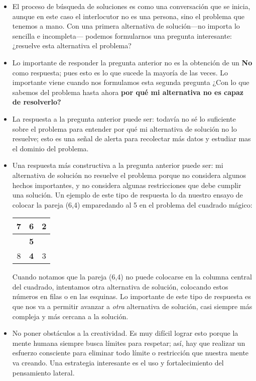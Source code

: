 \begin{itemize}
\item El proceso de búsqueda de soluciones es como una conversación que se inicia,
aunque en este caso el interlocutor no es una persona, sino el problema que tenemos a mano. 
Con una primera alternativa de solución---no importa lo sencilla e incompleta--- podemos 
formularnos una pregunta interesante: ¿resuelve esta alternativa el problema?

\item Lo importante de responder la pregunta anterior no es la obtención de un {\bf No} 
como respuesta; pues esto es lo que sucede la mayoría de las veces. Lo importante
viene cuando nos formulamos esta segunda pregunta ¿Con lo que sabemos del 
problema hasta ahora {\bf por qué mi alternativa no es capaz de resolverlo?} 

\item La respuesta a la pregunta anterior puede ser: todavía no sé lo suficiente 
sobre el problema para entender por qué mi alternativa de solución no lo resuelve;
esto es una señal de alerta para recolectar más datos y estudiar mas el dominio
del problema.

\item Una respuesta más constructiva a la pregunta anterior puede ser: mi alternativa
de solución no resuelve el problema porque no considera algunos hechos importantes,
y no considera algunas restricciones que debe cumplir una solución. Un ejemplo de
este tipo de respuesta lo da nuestro ensayo de colocar la pareja (6,4) emparedando
al 5 en el problema del cuadrado mágico:

\begin{center}
\begin{tabular}{|c|c|c|}
\hline 
 7 & {\bf 6} & 2\tabularnewline
\hline
  & {\bf 5} & \tabularnewline
\hline 
 8 & {\bf 4} & 3 \tabularnewline
\hline
\end{tabular}
\end{center}


Cuando notamos que la pareja (6,4) no puede colocarse en la columna central del 
cuadrado, intentamos otra alternativa de solución, colocando estos
números en filas o en las esquinas. Lo importante de este tipo de respuesta
es que nos va a permitir avanzar a {\em otra} alternativa de solución, casi
siempre más compleja y más cercana a la solución.


\item No poner obstáculos a la creatividad. Es muy difícil lograr esto porque la
mente humana siempre busca límites para respetar; así, hay que realizar un 
esfuerzo consciente para eliminar todo límite o restricción que nuestra mente 
va creando. Una estrategia interesante es el uso y fortalecimiento del 
pensamiento lateral.



\end{itemize}
